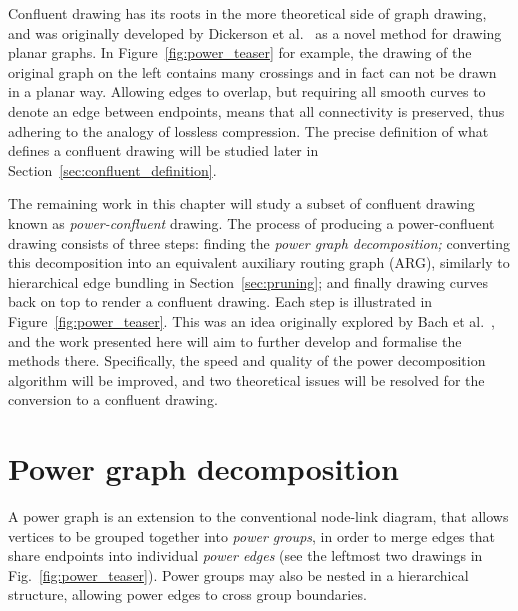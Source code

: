 Confluent drawing has its roots in the more theoretical side of graph drawing, and was originally developed by Dickerson et al.\ \cite{Dickerson2005} as a novel method for drawing planar graphs. In Figure~\ref{fig:power_teaser} for example, the drawing of the original graph on the left contains many crossings and in fact can not be drawn in a planar way. Allowing edges to overlap, but requiring all smooth curves to denote an edge between endpoints, means that all connectivity is preserved, thus adhering to the analogy of lossless compression.
The precise definition of what defines a confluent drawing will be studied later in Section~\ref{sec:confluent_definition}.

The remaining work in this chapter will study a subset of confluent drawing known as \emph{power-confluent} drawing.
The process of producing a power-confluent drawing consists of three steps: finding the \emph{power graph decomposition;} converting this decomposition into an equivalent auxiliary routing graph (ARG), similarly to hierarchical edge bundling in Section~\ref{sec:pruning}; and finally drawing curves back on top to render a confluent drawing. Each step is illustrated in Figure~\ref{fig:power_teaser}. This was an idea originally explored by Bach et al.\ \cite{Bach2017}, and the work presented here will aim to further develop and formalise the methods there.
Specifically, the speed and quality of the power decomposition algorithm will be improved, and two theoretical issues will be resolved for the conversion to a confluent drawing.

\section{Power graph decomposition}
\label{sec:power_graph}
A power graph is an extension to the conventional node-link diagram, that allows vertices to be grouped together into \emph{power groups}, in order to merge edges that share endpoints into individual \emph{power edges} (see the leftmost two drawings in Fig.~\ref{fig:power_teaser}). Power groups may also be nested in a hierarchical structure, allowing power edges to cross group boundaries.


